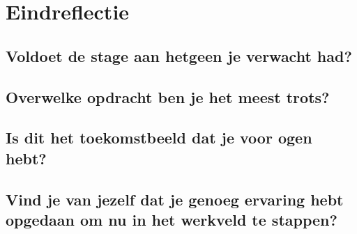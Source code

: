 \section{Eindreflectie}
\label{sec:Eindreflectie}

\subsection{Voldoet de stage aan hetgeen je verwacht had?}

\subsection{Overwelke opdracht ben je het meest trots?}

\subsection{Is dit het toekomstbeeld dat je voor ogen hebt?}

\subsection{Vind je van jezelf dat je genoeg ervaring hebt opgedaan om nu in het werkveld te stappen?}
